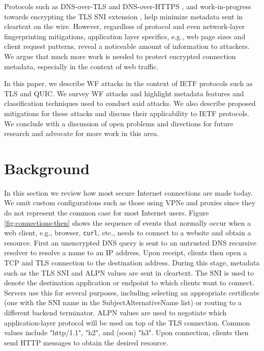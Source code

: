 \documentclass[runningheads]{llncs}
\begin{document}
Protocols such as DNS-over-TLS and DNS-over-HTTPS \cite{rfc8484}, and work-in-progress
towards encrypting the TLS SNI extension \cite{ietf-tls-esni-02}, help minimize metadata sent
in cleartext on the wire. However, regardless of protocol and even network-layer fingerprinting
mitigations, application layer specifics, e.g., web page sizes and client
request patterns, reveal a noticeable amount of information to attackers. We argue
that much more work is needed to protect encrypted connection metadata, especially
in the context of web traffic.

In this paper, we describe WF attacks in the context of IETF protocols such as TLS and
QUIC. We survey WF attacks and highlight metadata features and classification techniques
used to conduct said attacks. We also describe proposed mitigations for these attacks
and discuss their applicability to IETF protocols. We conclude with a discussion of open
problems and directions for future research and advocate for more work in this area.


\section{Background}
In this section we review how most secure Internet connections are made today. We omit custom
configurations such as those using VPNs and proxies since they do not represent the common case
for most Internet users. Figure \ref{fig:connections-then} shows the sequence of events that
normally occur when a web client, e.g., browser, {\tt curl}, etc., needs to connect to a website
and obtain a resource. First an unencrypted DNS query is sent to an untrusted DNS recursive
resolver to resolve a name to an IP address. Upon receipt, clients then open a TCP and TLS
connection to the destination address. During this stage, metadata such as the TLS SNI and ALPN
values are sent in cleartext. The SNI is used to denote the destination application or endpoint
to which clients want to connect. Servers use this for several purposes, including selecting
an appropriate certificate (one with the SNI name in the SubjectAlternativeName list) or
routing to a different backend terminator. ALPN values are used to negotiate which application-layer
protocol will be used on top of the TLS connection. Common values include "http/1.1", "h2", and
(soon) "h3". Upon connection, clients then send HTTP messages to obtain the desired resource.
\end{document}
